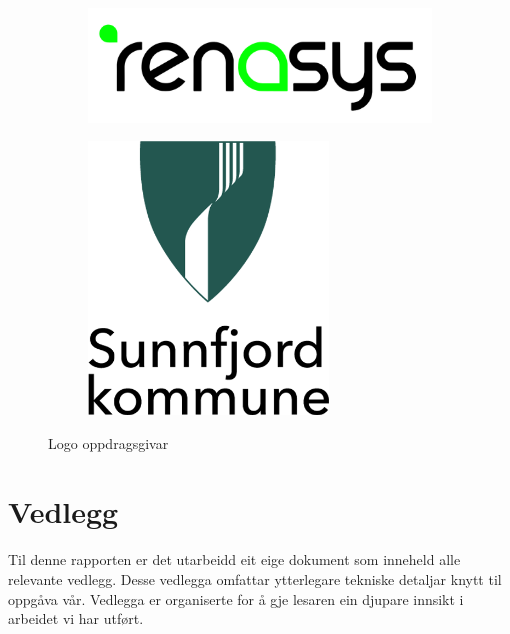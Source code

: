 \begin{figure}[htbp]
    \centering
    \begin{subfigure}[b]{0.3\textwidth}
        \centering
        \includegraphics[width=1\textwidth]{Bilder/renasys.png}
    \end{subfigure}
    \hfill
    \begin{subfigure}[b]{0.3\textwidth}
        \centering
        \includegraphics[width=0.7\textwidth]{Bilder/SK.png}
    \end{subfigure}
    \caption{Logo oppdragsgivar}\label{fig:Oppdragsgivar}
\end{figure}

\section{Vedlegg}
Til denne rapporten er det utarbeidd eit eige dokument som inneheld alle relevante vedlegg. 
Desse vedlegga omfattar ytterlegare tekniske detaljar knytt til oppgåva vår.\newline
Vedlegga er organiserte for å gje lesaren ein djupare innsikt i arbeidet vi har utført.